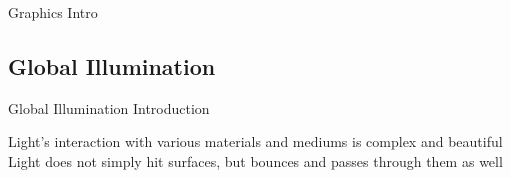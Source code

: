 \documentclass[10pt,compress,professionalfont]{beamer}
\begin{document}
\begin{frame}{Graphics Intro}
\end{frame}




\subsection{Global Illumination}
\begin{frame}{Global Illumination Introduction}

    Light's interaction with various materials and mediums is complex and beautiful\\
    \vspace{6mm}
    Light does not simply hit surfaces, but bounces and passes through them as well\\
    \vspace{4mm}


\end{frame}
\end{document}
